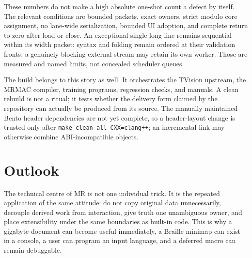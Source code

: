 \documentclass[a4paper,10pt,twoside,openany]{book}
\newcommand{\mr}{\textsc{MR}}
\begin{document}
These numbers do not make a high absolute one-shot count a defect by itself.
The relevant conditions are bounded packets, exact owners, strict modulo core
assignment, no lane-wide serialization, bounded UI adoption, and complete
return to zero after load or close. An exceptional single long line remains
sequential within its width packet; syntax and folding remain ordered at their
validation fronts; a genuinely blocking external stream may retain its own
worker. Those are measured and named limits, not concealed scheduler queues.

The build belongs to this story as well. It orchestrates the TVision upstream,
the MRMAC compiler, training programs, regression checks, and manuals. A clean
rebuild is not a ritual; it tests whether the delivery form claimed by the
repository can actually be produced from its source. The manually maintained
Bento header dependencies are not yet complete, so a header-layout change is
trusted only after \texttt{make clean all CXX=clang++}; an incremental link may
otherwise combine ABI-incompatible objects.

\backmatter
\chapter*{Outlook}

The technical centre of \mr{} is not one individual trick. It is the repeated
application of the same attitude: do not copy original data unnecessarily,
decouple derived work from interaction, give truth one unambiguous owner, and
place extensibility under the same boundaries as built-in code. This is why a
gigabyte document can become useful immediately, a Braille minimap can exist
in a console, a user can program an input language, and a deferred macro can
remain debuggable.
\end{document}
